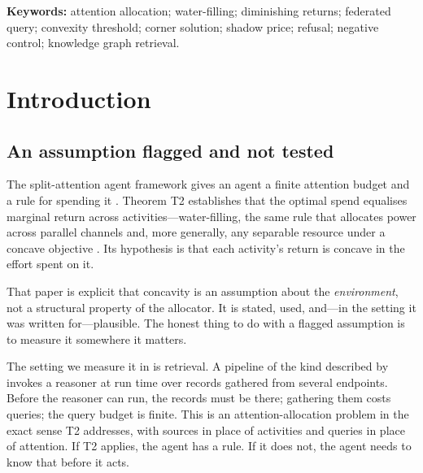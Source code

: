 \documentclass[11pt,twocolumn,a4paper]{article}
\theoremstyle{thmstyle}
\theoremstyle{definition}
\theoremstyle{remark}
\newcommand{\estar}{e^{*}}
\begin{document}
\begin{abstract}
We report two of our own measurement errors and one genuine flaw in the
allocator, because each is load-bearing. The first two made the finding
look like an artefact---Monte Carlo noise five times the true curvature,
then a parity artefact---and were settled only by evaluating the closed
form with no sampling at all. The third is more instructive:
$\text{budget}\ge\sum_i\estar_i$ is \emph{necessary but not sufficient}
for the interior solution to be optimal, and an allocator built on that
false sufficiency loses $8\%$ at the boundary. No self-consistency check
could have caught it; only the brute-force comparison did.
\end{abstract}

\noindent\textbf{Keywords:} attention allocation; water-filling;
diminishing returns; federated query; convexity threshold; corner
solution; shadow price; refusal; negative control; knowledge graph
retrieval.

\tableofcontents

\section{Introduction}
\label{sec:intro}

\subsection{An assumption flagged and not tested}

The split-attention agent framework gives an agent a finite attention
budget and a rule for spending it \citep{sachikonye2026splitattention}.
Theorem T2 establishes that the optimal spend equalises marginal return
across activities---water-filling, the same rule that allocates power
across parallel channels \citep{cover2006elements} and, more generally,
any separable resource under a concave objective
\citep{boyd2004convex}. Its hypothesis is that each activity's return is
concave in the effort spent on it.

That paper is explicit that concavity is an assumption about the
\emph{environment}, not a structural property of the allocator. It is
stated, used, and---in the setting it was written for---plausible. The
honest thing to do with a flagged assumption is to measure it somewhere
it matters.

The setting we measure it in is retrieval. A pipeline of the kind
described by \citet{doerr2025limits} invokes a reasoner at run time over
records gathered from several endpoints. Before the reasoner can run,
the records must be there; gathering them costs queries; the query budget
is finite. This is an attention-allocation problem in the exact sense T2
addresses, with sources in place of activities and queries in place of
attention. If T2 applies, the agent has a rule. If it does not, the agent
needs to know that before it acts.
\end{document}
